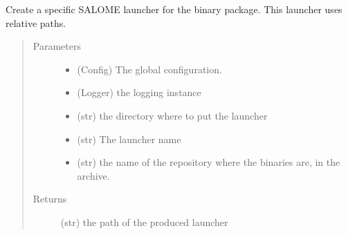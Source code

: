 \documentclass[a4paper,10pt,english]{sphinxmanual}
\begin{document}
\begin{fulllineitems}
\label{\detokenize{apidoc_commands/commands:commands.package.produce_relative_launcher}}
Create a specific SALOME launcher for the binary package.
This launcher uses relative paths.
\begin{quote}\begin{description}
\item[{Parameters}] \leavevmode\begin{itemize}
\item {} 
 \textendash{} (Config) The global configuration.

\item {} 
 \textendash{} (Logger) the logging instance

\item {} 
 \textendash{} (str) the directory where to put the launcher

\item {} 
 \textendash{} (str) The launcher name

\item {} 
 \textendash{} (str) 
the name of the repository where the binaries are, in the archive.

\end{itemize}

\item[{Returns}] \leavevmode
(str) the path of the produced launcher

\end{description}\end{quote}

\end{fulllineitems}

\end{document}
